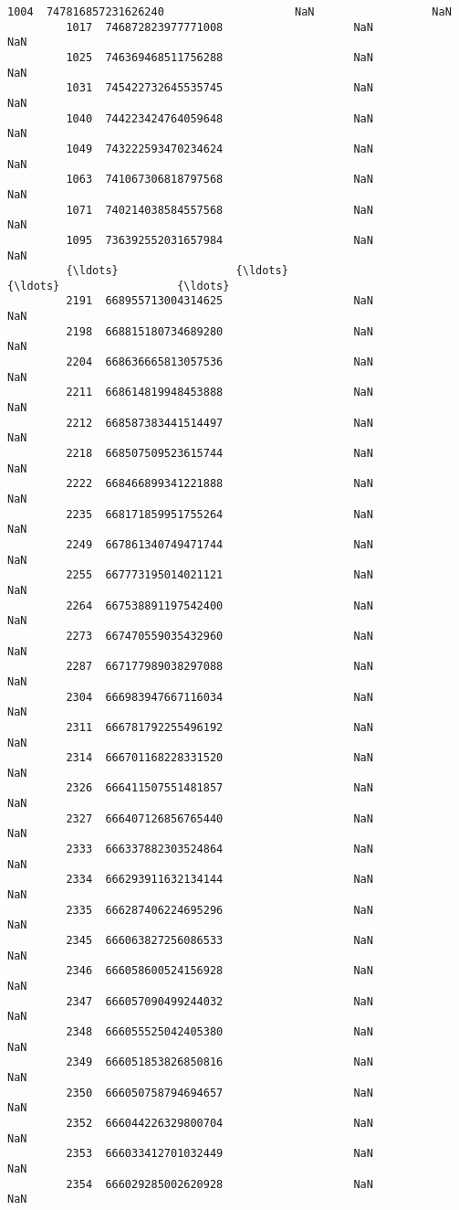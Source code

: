 \documentclass[11pt]{article}
\begin{document}
\begin{Verbatim}[commandchars=\\\{\}]
         1004  747816857231626240                    NaN                  NaN   
         1017  746872823977771008                    NaN                  NaN   
         1025  746369468511756288                    NaN                  NaN   
         1031  745422732645535745                    NaN                  NaN   
         1040  744223424764059648                    NaN                  NaN   
         1049  743222593470234624                    NaN                  NaN   
         1063  741067306818797568                    NaN                  NaN   
         1071  740214038584557568                    NaN                  NaN   
         1095  736392552031657984                    NaN                  NaN   
         {\ldots}                  {\ldots}                    {\ldots}                  {\ldots}   
         2191  668955713004314625                    NaN                  NaN   
         2198  668815180734689280                    NaN                  NaN   
         2204  668636665813057536                    NaN                  NaN   
         2211  668614819948453888                    NaN                  NaN   
         2212  668587383441514497                    NaN                  NaN   
         2218  668507509523615744                    NaN                  NaN   
         2222  668466899341221888                    NaN                  NaN   
         2235  668171859951755264                    NaN                  NaN   
         2249  667861340749471744                    NaN                  NaN   
         2255  667773195014021121                    NaN                  NaN   
         2264  667538891197542400                    NaN                  NaN   
         2273  667470559035432960                    NaN                  NaN   
         2287  667177989038297088                    NaN                  NaN   
         2304  666983947667116034                    NaN                  NaN   
         2311  666781792255496192                    NaN                  NaN   
         2314  666701168228331520                    NaN                  NaN   
         2326  666411507551481857                    NaN                  NaN   
         2327  666407126856765440                    NaN                  NaN   
         2333  666337882303524864                    NaN                  NaN   
         2334  666293911632134144                    NaN                  NaN   
         2335  666287406224695296                    NaN                  NaN   
         2345  666063827256086533                    NaN                  NaN   
         2346  666058600524156928                    NaN                  NaN   
         2347  666057090499244032                    NaN                  NaN   
         2348  666055525042405380                    NaN                  NaN   
         2349  666051853826850816                    NaN                  NaN   
         2350  666050758794694657                    NaN                  NaN   
         2352  666044226329800704                    NaN                  NaN   
         2353  666033412701032449                    NaN                  NaN   
         2354  666029285002620928                    NaN                  NaN   
         

\end{Verbatim}
\end{document}
